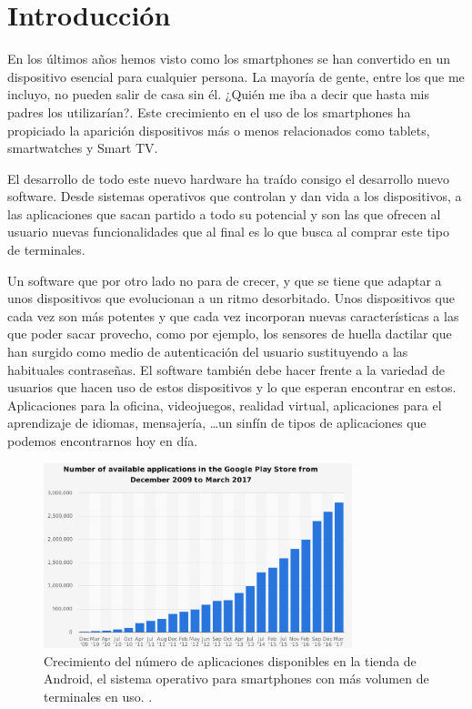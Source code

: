 \chapter{Introducción}\label{ch:introduction}

En los últimos años hemos visto como los smartphones se han convertido en un dispositivo esencial para cualquier persona. La mayoría de gente, entre los que me incluyo, no pueden salir de casa sin él. ¿Quién me iba a decir que hasta mis padres los utilizarían?. Este crecimiento en el uso de los smartphones ha propiciado la aparición dispositivos más o menos relacionados como tablets, smartwatches y Smart TV.

El desarrollo de todo este nuevo hardware ha traído consigo el desarrollo nuevo software. Desde sistemas operativos que controlan y dan vida a los dispositivos, a las aplicaciones que sacan partido a todo su potencial y son las que ofrecen al usuario nuevas funcionalidades que al final es lo que busca al comprar este tipo de terminales.

Un software que por otro lado no para de crecer, y que se tiene que adaptar a unos dispositivos que evolucionan a un ritmo desorbitado. Unos dispositivos que cada vez son más potentes y que cada vez incorporan nuevas características a las que poder sacar provecho, como por ejemplo, los sensores de huella dactilar que han surgido como medio de autenticación del usuario sustituyendo a las habituales contraseñas. El software también debe hacer frente a la variedad de usuarios que hacen uso de estos dispositivos y lo que esperan encontrar en estos. Aplicaciones para la oficina, videojuegos, realidad virtual, aplicaciones para el aprendizaje de idiomas, mensajería, \ldots un sinfín de tipos de aplicaciones que podemos encontrarnos hoy en día.

\begin{figure}[H]
\centering
  \includegraphics[width=0.8\textwidth]{Figures/ch1/introduction/google_play_number_of_apps}
  \caption{Crecimiento del número de aplicaciones disponibles en la tienda de Android, el sistema operativo para smartphones con más volumen de terminales en uso. \cite{GooglePlayApps}.}
\end{figure}

